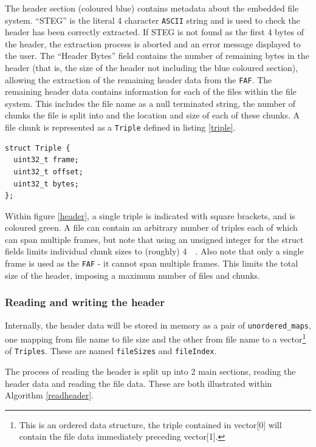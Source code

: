 \documentclass[paper=a4, fontsize=11pt,twoside]{scrartcl}    %
\numberwithin{table}{section}
\numberwithin{figure}{section}
\numberwithin{algorithm}{section}
\begin{document}
\noindent
The header section (coloured blue) contains metadata about the embedded file system. ``STEG'' is the literal 4 character \texttt{ASCII} string and is used to check the header has been correctly extracted. If STEG is not found as the first 4 bytes of the header, the extraction process is aborted and an error message displayed to the user. The ``Header Bytes'' field contains the number of remaining bytes in the header (that is, the size of the header not including the blue coloured section), allowing the extraction of the remaining header data from the \texttt{FAF}. The remaining header data contains information for each of the files within the file system. This includes the file name as a null terminated string, the number of chunks the file is split into and the location and size of each of these chunks. A file chunk is represented as a \texttt{Triple} defined in listing \ref{triple}.

\begin{lstlisting}[caption={Triple definition (\texttt{fs/stegfs.h:19})}, frame=single, label=triple,float,floatplacement=H]
struct Triple {
  uint32_t frame;
  uint32_t offset;
  uint32_t bytes;
};
\end{lstlisting}

\noindent
Within figure \ref{header}, a single triple is indicated with square brackets, and is coloured green. A file can contain an arbitrary number of triples each of which can span multiple frames, but note that using an unsigned integer for the struct fields limits individual chunk sizes to (roughly) \SI{4}{\giga\byte}. Also note that only a single frame is used as the \texttt{FAF} - it cannot span multiple frames. This limits the total size of the header, imposing a maximum number of files and chunks.

\subsubsection{Reading and writing the header}

Internally, the header data will be stored in memory as a pair of \texttt{unordered\_maps}, one mapping from file name to file size and the other from file name to a vector\footnote{This is an ordered data structure, the triple contained in vector[0] will contain the file data immediately preceding vector[1].} of \texttt{Triples}. These are named \texttt{fileSizes} and \texttt{fileIndex}.

The process of reading the header is split up into 2 main sections, reading the header data and reading the file data. These are both illustrated within Algorithm \ref{readheader}.
\end{document}

